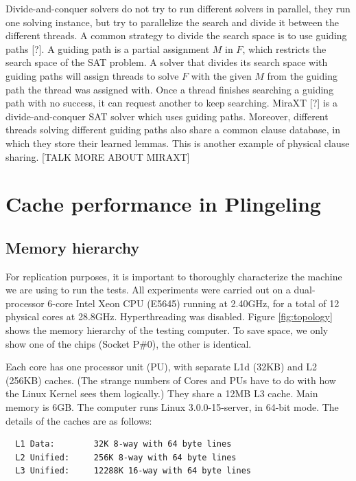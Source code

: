 \documentclass{llncs}
\begin{document}
Divide-and-conquer solvers do not try to run different solvers in
parallel, they run one solving instance, but try to parallelize the
search and divide it between the different threads. A common strategy
to divide the search space is to use guiding paths [?]. A guiding path
is a partial assignment $M$ in $F$, which restricts the search space
of the SAT problem. A solver that divides its search space with
guiding paths will assign threads to solve $F$ with the given $M$ from
the guiding path the thread was assigned with. Once a thread finishes
searching a guiding path with no success, it can request another to
keep searching. MiraXT [?] is a divide-and-conquer SAT solver which
uses guiding paths. Moreover, different threads solving different
guiding paths also share a common clause database, in which they store
their learned lemmas. This is another example of physical clause
sharing. [TALK MORE ABOUT MIRAXT]

\section{Cache performance in Plingeling}
\subsection{Memory hierarchy}
\label{sec:memhier}

For replication purposes, it is important to thoroughly characterize
the machine we are using to run the tests. All experiments were
carried out on a dual-processor 6-core Intel Xeon CPU (E5645) running
at 2.40GHz, for a total of 12 physical cores at
28.8GHz. Hyperthreading was disabled. Figure \ref{fig:topology} shows
the memory hierarchy of the testing computer. To save space, we only
show one of the chips (Socket P\#0), the other is identical.


Each core has one processor unit (PU), with separate L1d (32KB) and L2
(256KB) caches. (The strange numbers of Cores and PUs have to do with
how the Linux Kernel sees them logically.) They share a 12MB L3
cache. Main memory is 6GB. The computer runs Linux 3.0.0-15-server, in
64-bit mode. The details of the caches are as follows:

\small
\begin{verbatim}
  L1 Data:        32K 8-way with 64 byte lines
  L2 Unified:     256K 8-way with 64 byte lines
  L3 Unified:     12288K 16-way with 64 byte lines
\end{verbatim}
\normalsize
\end{document}
